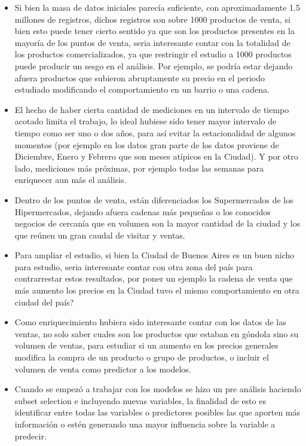 \begin{itemize}
  \item Si bien la masa de datos iniciales parecía suficiente, con aproximadamente 1.5 millones de registros, dichos registros son sobre 1000 productos de venta, si bien esto puede tener cierto sentido ya que son los productos presentes en la mayoría de los puntos de venta, seria interesante contar con la totalidad de los productos comercializados, ya que restringir el estudio a 1000 productos puede producir un sesgo en el análisis. Por ejemplo, se podría estar dejando afuera productos que subieron abruptamente su precio en el periodo estudiado modificando el comportamiento en un barrio o una cadena.
  \item El hecho de haber cierta cantidad de mediciones en un intervalo de tiempo acotado limita el trabajo, lo ideal hubiese sido tener mayor intervalo de tiempo como ser uno o dos años, para así evitar la estacionalidad de algunos momentos (por ejemplo en los datos gran parte de los datos proviene de Diciembre, Enero y Febrero que son meses atípicos en la Ciudad). Y por otro lado, mediciones más próximas, por ejemplo todas las semanas para enriquecer aun más el análisis.
  \item Dentro de los puntos de venta, están diferenciados los Supermercados de los Hipermercados, dejando afuera cadenas más pequeñas o los conocidos negocios de cercanía que en volumen son la mayor cantidad de la ciudad y los que reúnen un gran caudal de visitar y ventas.
  \item Para ampliar el estudio, si bien la Ciudad de Buenos Aires es un buen nicho para estudio, seria interesante contar con otra zona del país para contrarrestar estos resultados, por poner un ejemplo la cadena de venta que más aumento los precios en la Ciudad tuvo el mismo comportamiento en otra ciudad del país?
  \item Como enriquecimiento hubiera sido interesante contar con los datos de las ventas, no solo saber cuales son los productos que estaban en góndola sino su volumen de ventas, para estudiar si un aumento en los precios generales modifica la compra de un producto o grupo de productos, o incluir el volumen de venta como predictor a los modelos.
  \item Cuando se empezó a trabajar con los modelos se hizo un pre análisis haciendo subset selection e incluyendo nuevas variables, la finalidad de esto es identificar entre todas las variables o predictores posibles las que aporten más información o estén generando una mayor influencia sobre la variable a predecir.\\

\end{itemize}

